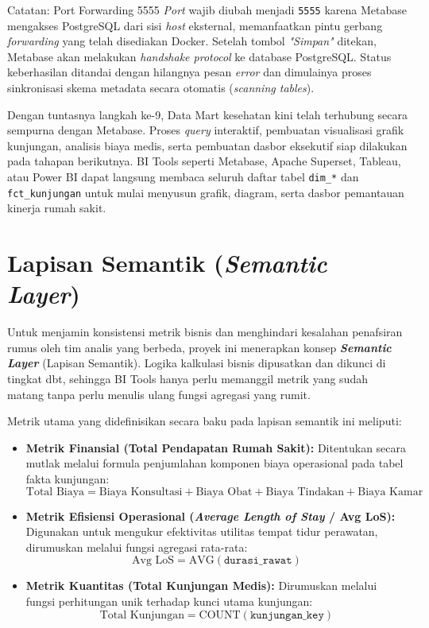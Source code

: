 \begin{enumerate}
  \begin{mybox}{Catatan: Port Forwarding 5555}
  \textit{Port} wajib diubah menjadi \texttt{5555} karena Metabase mengakses PostgreSQL dari sisi \textit{host} eksternal, memanfaatkan pintu gerbang \textit{forwarding} yang telah disediakan Docker. Setelah tombol \textit{"Simpan"} ditekan, Metabase akan melakukan \textit{handshake protocol} ke database PostgreSQL. Status keberhasilan ditandai dengan hilangnya pesan \textit{error} dan dimulainya proses sinkronisasi skema metadata secara otomatis (\textit{scanning tables}).
  \end{mybox}
 
\end{enumerate}
 
Dengan tuntasnya langkah ke-9, Data Mart kesehatan kini telah terhubung secara sempurna dengan Metabase. Proses \textit{query} interaktif, pembuatan visualisasi grafik kunjungan, analisis biaya medis, serta pembuatan dasbor eksekutif siap dilakukan pada tahapan berikutnya. BI Tools seperti Metabase, Apache Superset, Tableau, atau Power BI dapat langsung membaca seluruh daftar tabel \texttt{dim\_*} dan \texttt{fct\_kunjungan} untuk mulai menyusun grafik, diagram, serta dasbor pemantauan kinerja rumah sakit.
 
\section{Lapisan Semantik (\textit{Semantic Layer})}
 
Untuk menjamin konsistensi metrik bisnis dan menghindari kesalahan penafsiran rumus oleh tim analis yang berbeda, proyek ini menerapkan konsep \textbf{\textit{Semantic Layer}} (Lapisan Semantik). Logika kalkulasi bisnis dipusatkan dan dikunci di tingkat dbt, sehingga BI Tools hanya perlu memanggil metrik yang sudah matang tanpa perlu menulis ulang fungsi agregasi yang rumit.
 
Metrik utama yang didefinisikan secara baku pada lapisan semantik ini meliputi:
 
\begin{itemize}
  \item \textbf{Metrik Finansial (Total Pendapatan Rumah Sakit):} Ditentukan secara mutlak melalui formula penjumlahan komponen biaya operasional pada tabel fakta kunjungan:
  \[
    \text{Total Biaya} = \text{Biaya Konsultasi} + \text{Biaya Obat}
      + \text{Biaya Tindakan} + \text{Biaya Kamar}
  \]
 
  \item \textbf{Metrik Efisiensi Operasional (\textit{Average Length of Stay} / Avg LoS):} Digunakan untuk mengukur efektivitas utilitas tempat tidur perawatan, dirumuskan melalui fungsi agregasi rata-rata:
  \[
    \text{Avg LoS} = \text{AVG}(\texttt{durasi\_rawat})
  \]
  \item \textbf{Metrik Kuantitas (Total Kunjungan Medis):} Dirumuskan melalui fungsi perhitungan unik terhadap kunci utama kunjungan:
  \[
    \text{Total Kunjungan} = \text{COUNT}(\texttt{kunjungan\_key})
  \]
\end{itemize}
 
